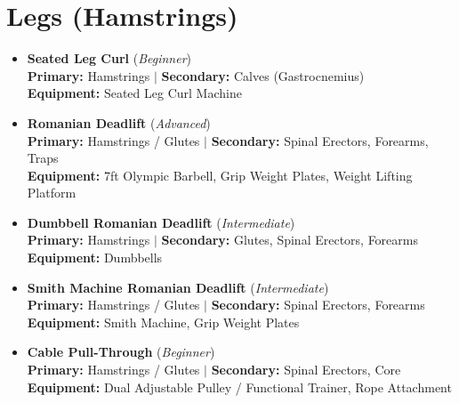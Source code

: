 \documentclass[11pt,a4paper]{article}
\begin{document}
\section*{Legs (Hamstrings)}
\begin{itemize}[leftmargin=*]
  \item \textbf{Seated Leg Curl} (\textit{Beginner})\\
        \textbf{Primary:} Hamstrings $|$ \textbf{Secondary:} Calves (Gastrocnemius)\\
        \textbf{Equipment:} Seated Leg Curl Machine
  \item \textbf{Romanian Deadlift} (\textit{Advanced})\\
        \textbf{Primary:} Hamstrings / Glutes $|$ \textbf{Secondary:} Spinal Erectors, Forearms, Traps\\
        \textbf{Equipment:} 7ft Olympic Barbell, Grip Weight Plates, Weight Lifting Platform
  \item \textbf{Dumbbell Romanian Deadlift} (\textit{Intermediate})\\
        \textbf{Primary:} Hamstrings $|$ \textbf{Secondary:} Glutes, Spinal Erectors, Forearms\\
        \textbf{Equipment:} Dumbbells
  \item \textbf{Smith Machine Romanian Deadlift} (\textit{Intermediate})\\
        \textbf{Primary:} Hamstrings / Glutes $|$ \textbf{Secondary:} Spinal Erectors, Forearms\\
        \textbf{Equipment:} Smith Machine, Grip Weight Plates
  \item \textbf{Cable Pull-Through} (\textit{Beginner})\\
        \textbf{Primary:} Hamstrings / Glutes $|$ \textbf{Secondary:} Spinal Erectors, Core\\
        \textbf{Equipment:} Dual Adjustable Pulley / Functional Trainer, Rope Attachment
\end{itemize}
\vspace{0.5em}
\end{document}
